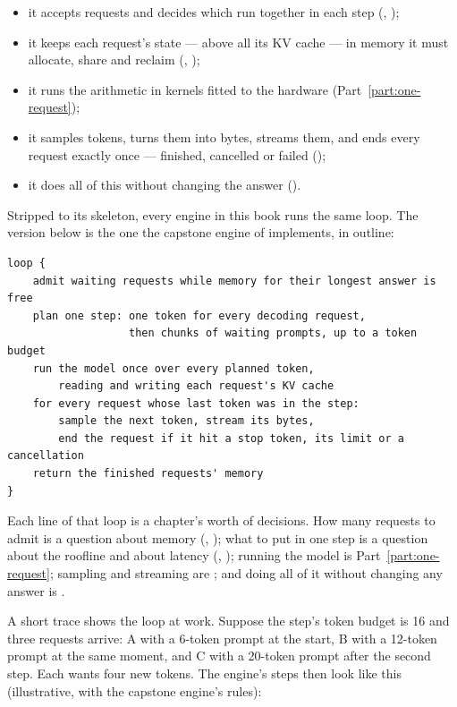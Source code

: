 \begin{itemize}
\item it accepts requests and decides which run together in each step
(, );
\item it keeps each request's state --- above all its KV cache --- in memory
it must allocate, share and reclaim (, );
\item it runs the arithmetic in kernels fitted to the hardware
(Part~\ref{part:one-request});
\item it samples tokens, turns them into bytes, streams them, and ends every
request exactly once --- finished, cancelled or failed
();
\item it does all of this without changing the answer
().
\end{itemize}

Stripped to its skeleton, every engine in this book runs the same loop. The
version below is the one the capstone engine of  implements, in
outline:

\begin{verbatim}
loop {
    admit waiting requests while memory for their longest answer is free
    plan one step: one token for every decoding request,
                   then chunks of waiting prompts, up to a token budget
    run the model once over every planned token,
        reading and writing each request's KV cache
    for every request whose last token was in the step:
        sample the next token, stream its bytes,
        end the request if it hit a stop token, its limit or a cancellation
    return the finished requests' memory
}
\end{verbatim}

\noindent Each line of that loop is a chapter's worth of decisions. How many
requests to admit is a question about memory (,
); what to put in one step is a question about the roofline and
about latency (, ); running
the model is Part~\ref{part:one-request}; sampling and streaming are
; and doing all of it without changing any answer is
.

A short trace shows the loop at work. Suppose the step's token budget is 16 and
three requests arrive: A with a 6-token prompt at the start, B with a 12-token
prompt at the same moment, and C with a 20-token prompt after the second step.
Each wants four new tokens. The engine's steps then look like this
(illustrative, with the capstone engine's rules):

